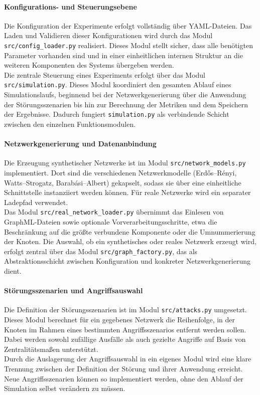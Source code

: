 \documentclass[12pt,a4paper]{article}
\begin{document}
\paragraph{Konfigurations- und Steuerungsebene}
Die Konfiguration der Experimente erfolgt vollständig über YAML-Dateien. Das
Laden und Validieren dieser Konfigurationen wird durch das Modul
\texttt{src/config\_loader.py} realisiert. Dieses Modul stellt sicher, dass
alle benötigten Parameter vorhanden sind und in einer einheitlichen internen
Struktur an die weiteren Komponenten des Systems übergeben werden.\\
Die zentrale Steuerung eines Experiments erfolgt über das Modul
\texttt{src/simulation.py}. Dieses Modul koordiniert den gesamten Ablauf eines
Simulationslaufs, beginnend bei der Netzwerkgenerierung über die Anwendung der
Störungsszenarien bis hin zur Berechnung der Metriken und dem Speichern der
Ergebnisse. Dadurch fungiert \texttt{simulation.py} als verbindende Schicht
zwischen den einzelnen Funktionsmodulen.

\paragraph{Netzwerkgenerierung und Datenanbindung}
Die Erzeugung synthetischer Netzwerke ist im Modul \texttt{src/network\_models.py}
implementiert. Dort sind die verschiedenen Netzwerkmodelle (Erdős--Rényi,
Watts--Strogatz, Barabási--Albert) gekapselt, sodass sie über eine einheitliche
Schnittstelle instanziiert werden können. Für reale Netzwerke wird ein separater Ladepfad verwendet. \\
Das Modul \texttt{src/real\_network\_loader.py} übernimmt das Einlesen von GraphML-Dateien
sowie optionale Vorverarbeitungsschritte, etwa die Beschränkung auf die größte
verbundene Komponente oder die Umnummerierung der Knoten. Die Auswahl, ob ein
synthetisches oder reales Netzwerk erzeugt wird, erfolgt zentral über das Modul
\texttt{src/graph\_factory.py}, das als Abstraktionsschicht zwischen
Konfiguration und konkreter Netzwerkgenerierung dient.

\paragraph{Störungsszenarien und Angriffsauswahl}
Die Definition der Störungsszenarien ist im Modul \texttt{src/attacks.py}
umgesetzt. Dieses Modul berechnet für ein gegebenes Netzwerk die Reihenfolge,
in der Knoten im Rahmen eines bestimmten Angriffsszenarios entfernt werden
sollen. Dabei werden sowohl zufällige Ausfälle als auch gezielte Angriffe auf
Basis von Zentralitätsmaßen unterstützt.\\
Durch die Auslagerung der Angriffsauswahl in ein eigenes Modul wird eine klare
Trennung zwischen der Definition der Störung und ihrer Anwendung erreicht. Neue
Angriffsszenarien können so implementiert werden, ohne den Ablauf der
Simulation selbst verändern zu müssen.
\end{document}
